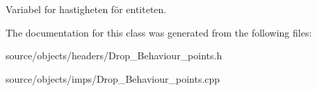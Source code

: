 Variabel for hastigheten för entiteten. 



The documentation for this class was generated from the following files\+:\begin{DoxyCompactItemize}
\item 
source/objects/headers/Drop\+\_\+\+Behaviour\+\_\+points.\+h\item 
source/objects/imps/Drop\+\_\+\+Behaviour\+\_\+points.\+cpp\end{DoxyCompactItemize}
